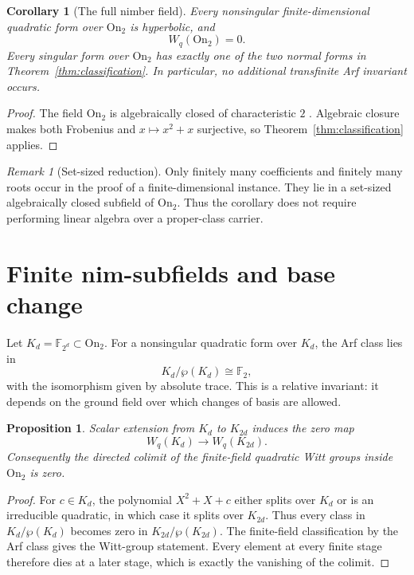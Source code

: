 \documentclass[11pt]{article}
\newtheorem{proposition}[theorem]{Proposition}
\newtheorem{corollary}[theorem]{Corollary}
\theoremstyle{definition}
\theoremstyle{remark}
\newtheorem{remark}[theorem]{Remark}
\newcommand{\F}{\mathbb{F}}
\newcommand{\On}{\mathrm{On}_2}
\newcommand{\wpmap}{\wp}
\begin{document}
\begin{corollary}[The full nimber field]\label{cor:on2}
Every nonsingular finite-dimensional quadratic form over $\On$ is
hyperbolic, and
\[
  W_q(\On)=0.
\]
Every singular form over $\On$ has exactly one of the two normal forms in
Theorem~\ref{thm:classification}.  In particular, no additional transfinite
Arf invariant occurs.
\end{corollary}

\begin{proof}
The field $\On$ is algebraically closed of characteristic $2$
\cite{conway1976,lenstra1978}.  Algebraic closure makes both Frobenius and
$x\mapsto x^2+x$ surjective, so Theorem~\ref{thm:classification} applies.
\end{proof}

\begin{remark}[Set-sized reduction]
Only finitely many coefficients and finitely many roots occur in the proof of
a finite-dimensional instance.  They lie in a set-sized algebraically closed
subfield of $\On$.  Thus the corollary does not require performing linear
algebra over a proper-class carrier.
\end{remark}

\section{Finite nim-subfields and base change}

Let $K_d=\F_{2^d}\subset\On$.  For a nonsingular quadratic form over $K_d$,
the Arf class lies in
\[
  K_d/\wpmap(K_d)\cong\F_2,
\]
with the isomorphism given by absolute trace.  This is a relative invariant:
it depends on the ground field over which changes of basis are allowed.

\begin{proposition}\label{prop:finite-extension}
Scalar extension from $K_d$ to $K_{2d}$ induces the zero map
\[
  W_q(K_d)\longrightarrow W_q(K_{2d}).
\]
Consequently the directed colimit of the finite-field quadratic Witt groups
inside $\On$ is zero.
\end{proposition}

\begin{proof}
For $c\in K_d$, the polynomial $X^2+X+c$ either splits over $K_d$ or is an
irreducible quadratic, in which case it splits over $K_{2d}$.  Thus every
class in $K_d/\wpmap(K_d)$ becomes zero in
$K_{2d}/\wpmap(K_{2d})$.  The finite-field classification by the Arf class
\cite{arf1941,dickson1901} gives the Witt-group statement.  Every element
at every finite stage therefore dies at a later stage, which is exactly the
vanishing of the colimit.
\end{proof}
\end{document}
